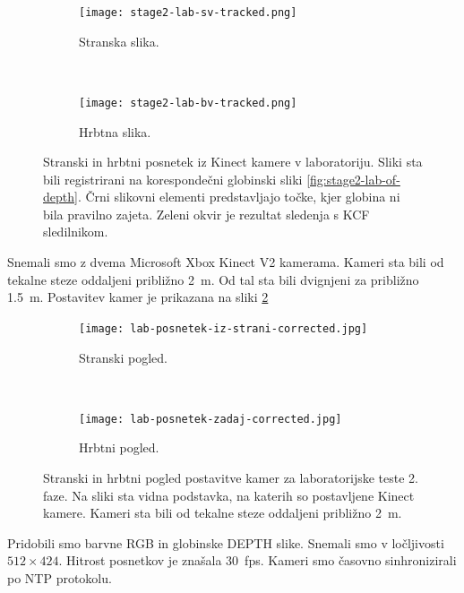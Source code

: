 \begin{figure}[!htb]
	\centering
	\begin{subfigure}{0.45\columnwidth}
		\texttt{[image: stage2-lab-sv-tracked.png]}
		\caption{Stranska slika.}
	\end{subfigure}
	~
	\begin{subfigure}{0.45\columnwidth}
		\texttt{[image: stage2-lab-bv-tracked.png]}
		\caption{Hrbtna slika.}
	\end{subfigure}
	\caption[Stranski in hrbtni posnetek iz Kinect kamere v laboratoriju]{Stranski in hrbtni posnetek iz Kinect kamere v laboratoriju. Sliki sta bili registrirani na korespondečni globinski sliki \ref{fig:stage2-lab-of-depth}. Črni slikovni elementi predstavljajo točke, kjer globina ni bila pravilno zajeta. Zeleni okvir je rezultat sledenja s KCF sledilnikom.}
	\label{fig:primer-posnetka-stage2}
\end{figure}

Snemali smo z dvema Microsoft Xbox Kinect V2 kamerama. Kameri sta bili od tekalne steze oddaljeni približno \SI{2}{m}. Od tal sta bili dvignjeni za približno \SI{1.5}{m}. Postavitev kamer je prikazana na sliki \ref{fig:lab-postavitev-kamer}

\begin{figure}[!htb]
	\centering
	\begin{subfigure}[t]{0.45\columnwidth}
		\texttt{[image: lab-posnetek-iz-strani-corrected.jpg]}
		\caption{Stranski pogled.}
	\end{subfigure}
	~
	\begin{subfigure}[t]{0.45\columnwidth}
		\texttt{[image: lab-posnetek-zadaj-corrected.jpg]}
		\caption{Hrbtni pogled.}
	\end{subfigure}
	\caption[Stranski in hrbtni pogled izvajanja lab. testov 2. faze]{Stranski in hrbtni pogled postavitve kamer za laboratorijske teste 2. faze. Na sliki sta vidna podstavka, na katerih so postavljene Kinect kamere. Kameri sta bili od tekalne steze oddaljeni približno \SI{2}{m}.}
	\label{fig:lab-postavitev-kamer}
\end{figure}


Pridobili smo barvne RGB in globinske DEPTH slike. Snemali smo v ločljivosti $512 \times 424$. Hitrost posnetkov je znašala \SI{30}{fps}. Kameri smo časovno sinhronizirali po NTP protokolu.


